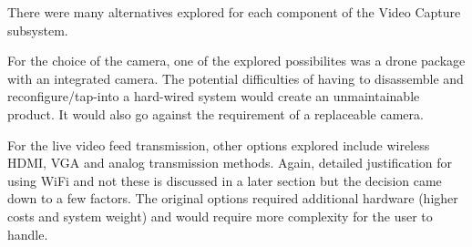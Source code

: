 There were many alternatives explored for each component of the Video Capture subsystem.

For the choice of the camera, one of the explored possibilites was a drone package with an integrated camera. The potential difficulties of having to disassemble and reconfigure/tap-into a hard-wired system would create an unmaintainable product. It would also go against the requirement of a replaceable camera.

For the live video feed transmission, other options explored include wireless HDMI, VGA and analog transmission methods. Again, detailed justification for using WiFi and not these is discussed in a later section but the decision came down to a few factors. The original options required additional hardware (higher costs and system weight) and would require more complexity for the user to handle.
